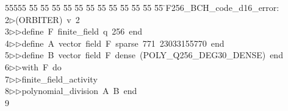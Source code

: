 %
%
\begin{tabbing}
55555 \= 55 \= 55 \= 55 \= 55 \= 55 \= 55 \= 55 \= 55 \= 55 \= 55 \= 55 \= 55 \= \>F256\_BCH\_code\_d16\_error:\\[0pt]
2\>$\triangleright$\>(ORBITER)\ v\ 2\ \\[0pt]
3\>$\triangleright$\>$\triangleright$\>define\ F\ finite\_field\ q\ 256\ end\ \\[0pt]
4\>$\triangleright$\>$\triangleright$\>define\ A\ vector\ field\ F\ sparse\ 771\ 23033155770\ end\ \\[0pt]
5\>$\triangleright$\>$\triangleright$\>define\ B\ vector\ field\ F\ dense\ (POLY\_Q256\_DEG30\_DENSE)\ end\ \\[0pt]
6\>$\triangleright$\>$\triangleright$\>with\ F\ do\ \\[0pt]
7\>$\triangleright$\>$\triangleright$\>finite\_field\_activity\ \\[0pt]
8\>$\triangleright$\>$\triangleright$\>polynomial\_division\ A\ B\ end\\[0pt]
9\>\end{tabbing}

